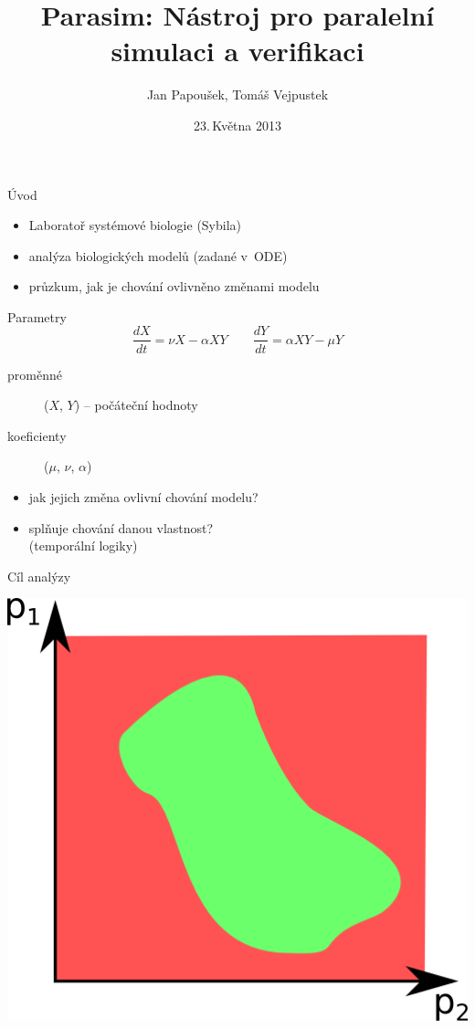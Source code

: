 \documentclass[xcolor=svgnames,14pt]{beamer}
\title[Parasim]{Parasim: Nástroj pro paralelní simulaci a verifikaci}
\author{Jan Papoušek, Tomáš Vejpustek}
\institute{}
\date{23.\,Května 2013}
\begin{document}
\frame[plain]{\titlepage}

\begin{frame}{Úvod}
	\begin{itemize}
		\item Laboratoř systémové biologie (Sybila)
		\item analýza biologických modelů (zadané v~ODE)
		\item průzkum, jak je chování ovlivněno změnami modelu
	\end{itemize}
\end{frame}

\begin{frame}{Parametry}
	$$\frac{dX}{dt}=\nu X-\alpha XY	\qquad	\frac{dY}{dt}=\alpha XY-\mu Y$$
	\begin{description}
		\item[proměnné] ($X$, $Y$) -- počáteční hodnoty
		\item[koeficienty] ($\mu$, $\nu$, $\alpha$)
	\end{description}
	\begin{itemize}
		\item jak jejich změna ovlivní chování modelu?
		\item splňuje chování danou vlastnost?\\
			(temporální logiky)
	\end{itemize}
\end{frame}

\begin{frame}{Cíl analýzy}
	\begin{center}\includegraphics[height=0.7\textheight]{paramspace.png}\end{center}
\end{frame}
\end{document}
